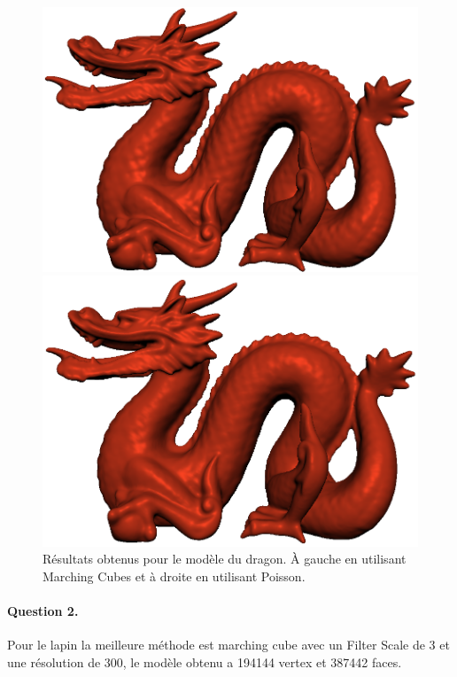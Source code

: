 \documentclass[french]{article}
\begin{document}
\begin{figure}[h]
	\centering
	\begin{minipage}{0.47\linewidth}
		\centering
		\includegraphics[width=\linewidth]{dragonrimls00.png}
	\end{minipage}\hfill
	\begin{minipage}{0.47\linewidth}
		\centering
		\includegraphics[width=\linewidth]{dragonpoisson00.png}
	\end{minipage}
	\caption{Résultats obtenus pour le modèle du dragon. À gauche en utilisant Marching Cubes et à droite en utilisant Poisson.}
	\label{fig:meshdragon}
\end{figure}

\paragraph{Question 2.}
Pour le lapin la  meilleure méthode est marching cube avec un Filter Scale de 3 et une résolution de 300, le modèle obtenu a 194144 vertex et  387442 faces.
\end{document}
